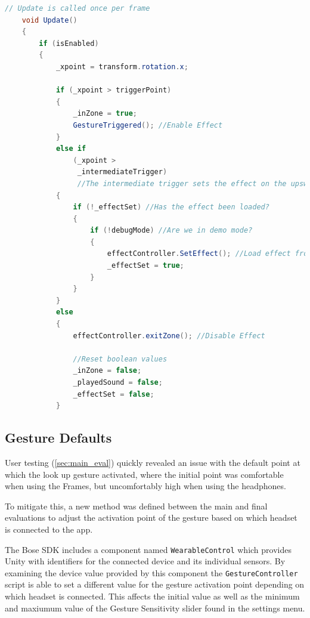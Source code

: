 \documentclass{l4proj}
\begin{document}
\begin{lstlisting}[language=java, float, caption={GestureController's Update() method which hands off to the EffectController based on the current rotation of the device.}, label=lst:gesture_update]
    // Update is called once per frame
    void Update()
    {
        if (isEnabled)
        {
            _xpoint = transform.rotation.x;

            if (_xpoint > triggerPoint)
            {
                _inZone = true;
                GestureTriggered(); //Enable Effect
            }
            else if
                (_xpoint >
                 _intermediateTrigger)
                 //The intermediate trigger sets the effect on the upswing and gives the user more neck freedom on the downswing
            {
                if (!_effectSet) //Has the effect been loaded?
                {
                    if (!debugMode) //Are we in demo mode?
                    {
                        effectController.SetEffect(); //Load effect from JSON
                        _effectSet = true;
                    }
                }
            }
            else
            {
                effectController.exitZone(); //Disable Effect

                //Reset boolean values
                _inZone = false;
                _playedSound = false;
                _effectSet = false;
            }

\end{lstlisting}
\subsection{Gesture Defaults}

User testing (\ref{sec:main_eval}) quickly revealed an issue with the default point at which the look up gesture activated, where the initial point was comfortable when using the Frames, but uncomfortably high when using the headphones.

To mitigate this, a new method was defined between the main and final evaluations to adjust the activation point of the gesture based on which headset is connected to the app.

The Bose SDK includes a component named \texttt{WearableControl} which provides Unity with identifiers for the connected device and its individual sensors. By examining the device value provided by this component the \texttt{GestureController} script is able to set a different value for the gesture activation point depending on which headset is connected. This affects the initial value as well as the minimum and maxiumum value of the Gesture Sensitivity slider found in the settings menu.
\end{document}
